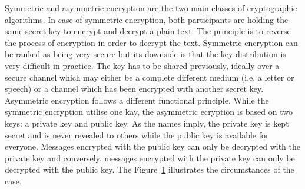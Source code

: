 Symmetric and asymmetric encryption are the two main classes of cryptographic algorithms.
In case of symmetric encryption, both participants are holding the same secret key to encrypt and decrypt a plain text.
The principle is to reverse the process of encryption in order to decrypt the text.
Symmetric encryption can be ranked as being very secure but its downside is that the key distribution is very difficult in practice.
The key has to be shared previously, ideally over a secure channel which may either be a complete different medium (i.e. a letter or speech) or a channel which has been encrypted with another secret key.
Asymmetric encryption follows a different functional principle.
While the symmetric encryption utilise one kay, the asymmetric ecryption is based on two keys: a private key and public key.
As the names imply, the private key is kept secret and is never revealed to others while the public key is available for everyone.
Messages encrypted with the public key can only be decrypted with the private key and conversely, messages encrypted with the private key can only be decrypted with the public key. 
The Figure~\ref{fig:asymmetric_encryption} illustrates the circumstances of the case.\\
\begin{figure}[htb]
	\centering%
	\\
	\label{fig:asymmetric_encryption}
\end{figure}


